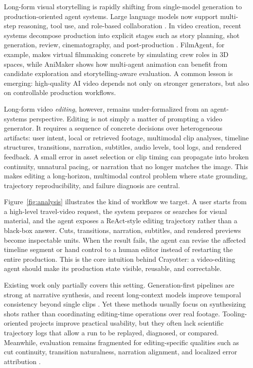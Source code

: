 ﻿\documentclass[11pt]{article}
\begin{document}
Long-form visual storytelling is rapidly shifting from single-model generation
to production-oriented agent systems. Large language models now support
multi-step reasoning, tool use, and role-based collaboration
\cite{react23,autogen23,metagpt23}. In video creation, recent systems decompose
production into explicit stages such as story planning, shot generation,
review, cinematography, and post-production
\cite{videoDirectorGPT24,dreamFactory24,movieAgent25,mmStoryAgent25,filmAgent25,
animaker25}. FilmAgent, for example, makes virtual filmmaking concrete by
simulating crew roles in 3D spaces, while AniMaker shows how multi-agent
animation can benefit from candidate exploration and storytelling-aware
evaluation. A common lesson is emerging: high-quality AI video depends not only
on stronger generators, but also on controllable production workflows.

Long-form video \emph{editing}, however, remains under-formalized from an
agent-systems perspective. Editing is not simply a matter of prompting a video
generator. It requires a sequence of concrete decisions over heterogeneous
artifacts: user intent, local or retrieved footage, multimodal clip analyses,
timeline structures, transitions, narration, subtitles, audio levels, tool logs,
and rendered feedback. A small error in asset selection or clip timing can
propagate into broken continuity, unnatural pacing, or narration that no longer
matches the image. This makes editing a long-horizon, multimodal control problem
where state grounding, trajectory reproducibility, and failure diagnosis are
central.

Figure~\ref{fig:analysis} illustrates the kind of workflow we target. A user
starts from a high-level travel-video request, the system prepares or searches
for visual material, and the agent exposes a ReAct-style editing trajectory
rather than a black-box answer. Cuts, transitions, narration, subtitles, and
rendered previews become inspectable units. When the result fails, the agent can
revise the affected timeline segment or hand control to a human editor instead
of restarting the entire production. This is the core intuition behind
Crayotter: a video-editing agent should make its production state visible,
reusable, and correctable.

Existing work only partially covers this setting. Generation-first pipelines are
strong at narrative synthesis, and recent long-context models improve temporal
consistency beyond single clips \cite{fifo24,lct25,mint25,oneMinute25}. Yet
these methods usually focus on synthesizing shots rather than coordinating
editing-time operations over real footage. Tooling-oriented projects improve
practical usability, but they often lack scientific trajectory logs that allow a
run to be replayed, diagnosed, or compared. Meanwhile, evaluation remains
fragmented for editing-specific qualities such as cut continuity, transition
naturalness, narration alignment, and localized error attribution
\cite{dreamStory24,storyIter24,viStoryBench26,evalCrafter24}.
\end{document}
